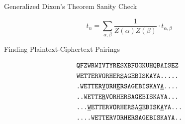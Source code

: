 \documentclass[hyphens,aspectratio=169]{beamer}
\begin{document}
\begin{frame}[fragile]{Generalized Dixon's Theorem Sanity Check}
\begin{center}
\[
  t_n = \sum_{\alpha,\beta}\frac{1}{Z(\alpha)Z(\beta)}\cdot t_{\alpha,\beta}
\]
\end{center}
\end{frame}

\begin{frame}[fragile]{Finding Plaintext-Ciphertext Pairings}
\begin{center}
\begin{align*}
  & \texttt{QFZWRWIVTYRESXBFOGKUHQBAISEZ}
  \\
  & \texttt{WETTERVORHER}{\uline{\texttt{S}}}\texttt{AGEBISKAYA.....}
  \\
  &
  \texttt{.WETTER}{\uline{\texttt{V}}}\texttt{ORH}{\uline{\texttt{E}}}\texttt{RSAGEBISKAY}{\uline{\texttt{A}}}\texttt{....}
  \\
  & \texttt{..WETTE}{\uline{\texttt{R}}}\texttt{VORHERSAGEBISKAYA...}
  \\
  &
  \texttt{...}{\uline{\texttt{W}}}\texttt{ETTERVORHERSA}{\uline{\texttt{G}}}\texttt{EBISK}{\uline{\texttt{A}}}\texttt{YA...}
  \\
  & \texttt{....WETTERVORHERSAGEBISKAYA..}
  \\
\end{align*}
\end{center}
\end{frame}
\end{document}
